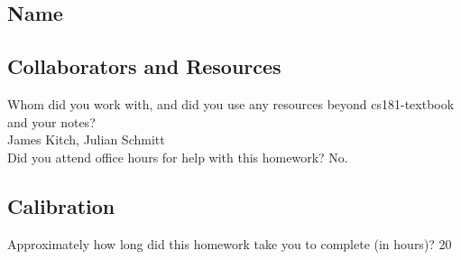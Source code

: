 \documentclass[submit]{harvardml}
\begin{document}
\newpage
\subsection*{Name}

\subsection*{Collaborators and Resources}
Whom did you work with, and did you use any resources beyond cs181-textbook and your notes?\\
James Kitch, Julian Schmitt
\\
Did you attend office hours for help with this homework?
No.

\subsection*{Calibration}
Approximately how long did this homework take you to complete (in hours)? 
20
\end{document}
